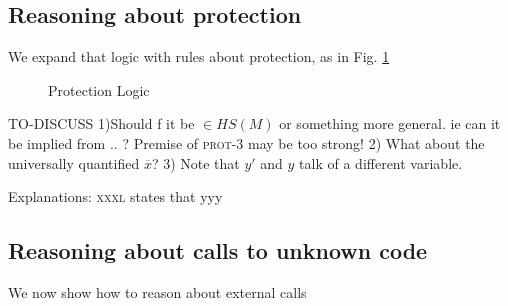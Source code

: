 \subsection{Reasoning about protection}
We expand that logic with rules about protection, as in Fig. \ref{f:protection}

\begin{figure}[hbt]
\footnotesize
{}
\caption{Protection Logic}
\label{f:protection}
\end{figure}

TO-DISCUSS 1)Should f it be $\in HS(M)$ or something more general. ie can it be implied from .. ? Premise of  \textsc{prot-3} may be too strong!
2) What about the universally quantified $\overline x$? 3)  Note that $y'$ and $y$ talk of a different variable.
 

Explanations: \textsc{xxxl} states that   yyy
  
 
\subsection{Reasoning about calls to unknown code}

We now show how to reason about external calls

